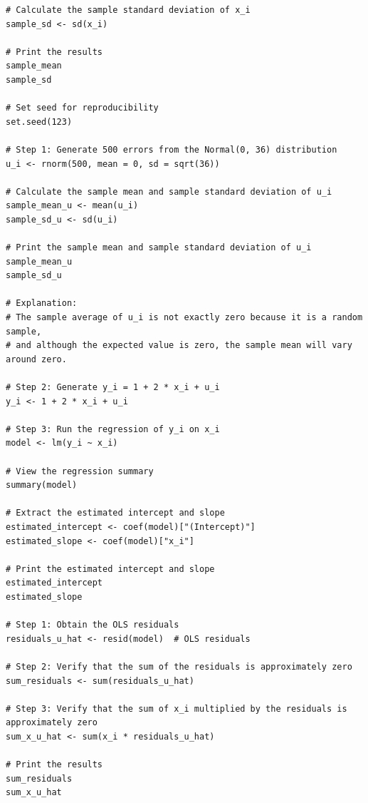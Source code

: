 \documentclass[12pt]{article}
\begin{document}
\begin{enumerate}
{\begin{lstlisting}
# Calculate the sample standard deviation of x_i
sample_sd <- sd(x_i)

# Print the results
sample_mean
sample_sd

# Set seed for reproducibility
set.seed(123)

# Step 1: Generate 500 errors from the Normal(0, 36) distribution
u_i <- rnorm(500, mean = 0, sd = sqrt(36))

# Calculate the sample mean and sample standard deviation of u_i
sample_mean_u <- mean(u_i)
sample_sd_u <- sd(u_i)

# Print the sample mean and sample standard deviation of u_i
sample_mean_u
sample_sd_u

# Explanation:
# The sample average of u_i is not exactly zero because it is a random sample,
# and although the expected value is zero, the sample mean will vary around zero.

# Step 2: Generate y_i = 1 + 2 * x_i + u_i
y_i <- 1 + 2 * x_i + u_i

# Step 3: Run the regression of y_i on x_i
model <- lm(y_i ~ x_i)

# View the regression summary
summary(model)

# Extract the estimated intercept and slope
estimated_intercept <- coef(model)["(Intercept)"]
estimated_slope <- coef(model)["x_i"]

# Print the estimated intercept and slope
estimated_intercept
estimated_slope

# Step 1: Obtain the OLS residuals
residuals_u_hat <- resid(model)  # OLS residuals

# Step 2: Verify that the sum of the residuals is approximately zero
sum_residuals <- sum(residuals_u_hat)

# Step 3: Verify that the sum of x_i multiplied by the residuals is approximately zero
sum_x_u_hat <- sum(x_i * residuals_u_hat)

# Print the results
sum_residuals
sum_x_u_hat
\end{lstlisting}

}

\end{enumerate}
\end{document}
